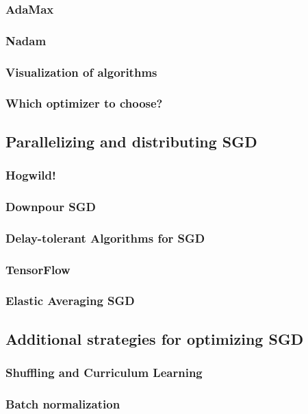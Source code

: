 \documentclass[a4paper,10pt]{ctexbook}
\begin{document}
\subsubsection{AdaMax}
\subsubsection{Nadam}
\subsubsection{Visualization of algorithms}
\subsubsection{Which optimizer to choose?}

\subsection{Parallelizing and distributing SGD}
\subsubsection{Hogwild!}
\subsubsection{Downpour SGD}
\subsubsection{Delay-tolerant Algorithms for SGD}
\subsubsection{TensorFlow}

\subsubsection{Elastic Averaging SGD}
\subsection{Additional strategies for optimizing SGD}
\subsubsection{Shuffling and Curriculum Learning}
\subsubsection{Batch normalization}
\end{document}
